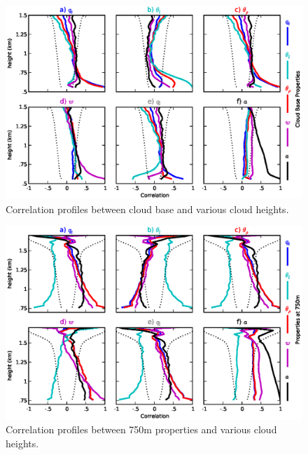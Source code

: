 \documentclass[acp]{copernicus}
\begin{document}
\begin{figure}[t]
\vspace*{2mm}
\begin{center}
\includegraphics[width=\textwidth]{./figures/cloud_base_profiles}
\end{center}
\caption{Correlation profiles between cloud base and various cloud heights.}
\label{fig:cloud_base_profiles}
\end{figure}

\begin{figure}[t]
\vspace*{2mm}
\begin{center}
\includegraphics[width=\textwidth]{./figures/750m_profiles}
\end{center}
\caption{Correlation profiles between 750m properties and various cloud heights.}
\label{fig:750m_profiles}
\end{figure}
\end{document}
